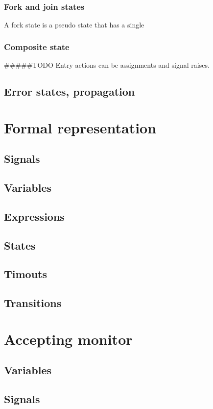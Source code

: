 {    \subsubsection{Fork and join states}
A fork state is a pseudo state that has a single 
    \subsubsection{Composite state}
    
    
#####TODO Entry actions can be assignments and signal raises.


  \subsection{Error states, propagation}
\section{Formal representation}
  \subsection{Signals}
  \subsection{Variables}
  \subsection{Expressions}
  \subsection{States}
  \subsection{Timouts}
  \subsection{Transitions}
\section{Accepting monitor}
  \subsection{Variables}
  \subsection{Signals}
}
